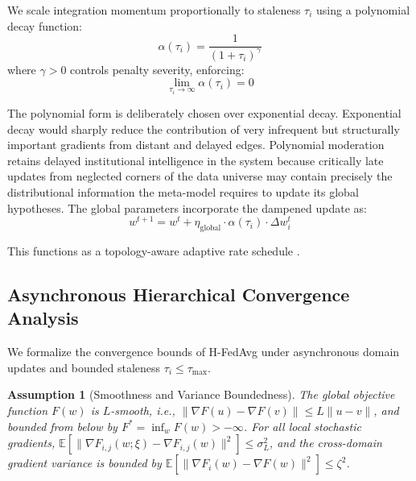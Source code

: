 \documentclass[conference]{IEEEtran}
\newtheorem{assumption}{Assumption}
\begin{document}
We scale integration momentum proportionally to staleness $\tau_i$ using a polynomial decay function:
\begin{equation}
\alpha(\tau_i) = \frac{1}{(1 + \tau_i)^\gamma}
\end{equation}
where $\gamma > 0$ controls penalty severity, enforcing:
\begin{equation}
\lim_{\tau_i \to \infty} \alpha(\tau_i) = 0
\end{equation}

The polynomial form is deliberately chosen over exponential decay. Exponential decay would sharply reduce the contribution of very infrequent but structurally important gradients from distant and delayed edges. Polynomial moderation retains delayed institutional intelligence in the system because critically late updates from neglected corners of the data universe may contain precisely the distributional information the meta-model requires to update its global hypotheses. The global parameters incorporate the dampened update as:
\begin{equation}
w^{t+1} = w^t + \eta_{\text{global}} \cdot \alpha(\tau_i) \cdot \Delta w_i^t
\end{equation}

This functions as a topology-aware adaptive rate schedule \cite{b26}.

\subsection{Asynchronous Hierarchical Convergence Analysis}
We formalize the convergence bounds of H-FedAvg under asynchronous domain updates and bounded staleness $\tau_i \le \tau_{\max}$.

\begin{assumption}[Smoothness and Variance Boundedness]
The global objective function $F(w)$ is $L$-smooth, i.e., $\|\nabla F(u) - \nabla F(v)\| \le L \|u - v\|$, and bounded from below by $F^* = \inf_w F(w) > -\infty$. For all local stochastic gradients, $\mathbb{E}[\|\nabla F_{i,j}(w; \xi) - \nabla F_{i,j}(w)\|^2] \le \sigma_L^2$, and the cross-domain gradient variance is bounded by $\mathbb{E}[\|\nabla F_i(w) - \nabla F(w)\|^2] \le \zeta^2$.
\end{assumption}
\end{document}
